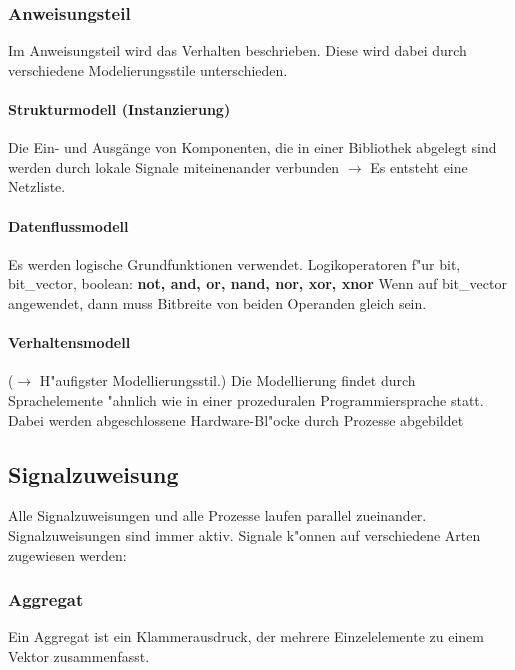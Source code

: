 		\subsubsection{Anweisungsteil}
			Im Anweisungsteil wird das Verhalten beschrieben. Diese wird dabei 		
			durch verschiedene Modelierungsstile unterschieden.
			\begin{multicols}{2}
				\paragraph{Strukturmodell (Instanzierung)}
				Die Ein- und Ausgänge von Komponenten, die 
				in einer Bibliothek abgelegt sind werden durch lokale Signale miteinenander 
				verbunden $\rightarrow$ Es entsteht eine Netzliste. 
				
			
			
			\paragraph{Datenflussmodell}
				Es werden logische Grundfunktionen verwendet.
				Logikoperatoren f"ur bit, bit\_vector, boolean: \textbf{not, and, or, nand, nor,
 				xor, xnor	} Wenn auf bit\_vector angewendet, dann muss Bitbreite von 
				beiden Operanden gleich sein.

					
					
			\end{multicols}
			\paragraph{Verhaltensmodell} ($\rightarrow$ H"aufigster Modellierungsstil.) 
				Die Modellierung findet durch Sprachelemente "ahnlich wie in einer 	
				prozeduralen Programmiersprache statt.\\
				Dabei werden abgeschlossene Hardware-Bl"ocke durch Prozesse 
				abgebildet
				

	
		\begin{multicols}{2}
		\subsection{Signalzuweisung}
		Alle Signalzuweisungen und alle Prozesse laufen parallel zueinander. Signalzuweisungen sind immer aktiv. Signale k"onnen auf verschiedene Arten zugewiesen werden:
			
			\vfill\null
			\columnbreak
			\subsubsection{Aggregat}
			Ein Aggregat ist ein Klammerausdruck, der mehrere Einzelelemente zu einem 
			Vektor zusammenfasst.
				
		\end{multicols}


